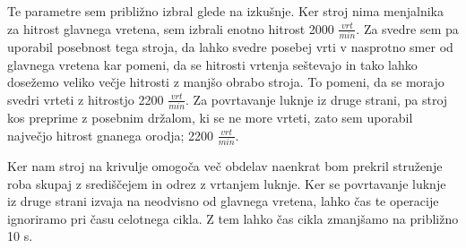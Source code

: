 Te parametre sem približno izbral glede na izkušnje. Ker stroj nima
menjalnika za hitrost glavnega vretena, sem izbrali enotno hitrost
2000 \( \frac{vrt}{min} \). Za svedre sem pa uporabil posebnost tega stroja,
da lahko svedre posebej vrti v nasprotno smer od glavnega vretena kar pomeni,
da se hitrosti vrtenja seštevajo in tako lahko dosežemo veliko večje hitrosti
z manjšo obrabo stroja. To pomeni, da se morajo svedri vrteti z hitrostjo
2200 \( \frac{vrt}{min} \). Za povrtavanje luknje iz druge strani, pa stroj
kos preprime z posebnim držalom, ki se ne more vrteti, zato sem uporabil največjo
hitrost gnanega orodja; 2200 \( \frac{vrt}{min} \).

Ker nam stroj na krivulje omogoča več obdelav naenkrat bom prekril
struženje roba skupaj z središčejem in odrez z vrtanjem luknje.
Ker se povrtavanje luknje iz druge strani izvaja na neodvisno od
glavnega vretena, lahko čas te operacije ignoriramo pri času
celotnega cikla.
Z tem lahko čas cikla zmanjšamo na približno 10 s.
